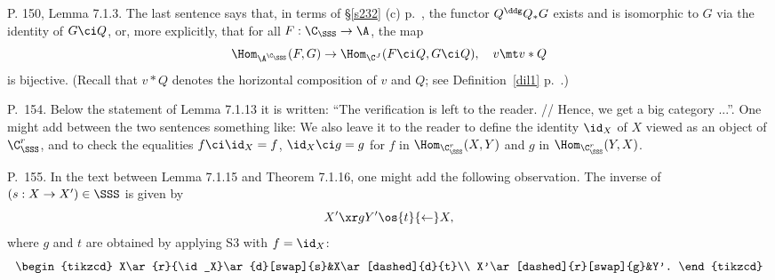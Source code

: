 \documentclass[12pt]{article}
\theoremstyle{remark}
\theoremstyle{definition}
\begin{document}
%


%

\begin{s} 
P. 150, Lemma 7.1.3. The last sentence says that, in terms of \S\ref{s232} (c) p.~, the functor $Q^\ddg Q_*G$ exists and is isomorphic to $G$ via the identity of $G\ci Q$, or, more explicitly, that for all $F:\C_\SSS\to\A$, the map 
$$
\Hom_{\A^{\C_\SSS}}(F,G)\to\Hom_{\C^J}(F\ci Q,G\ci Q),\quad v\mt v*Q
$$ 
is bijective. (Recall that $v*Q$ denotes the horizontal composition of $v$ and $Q$; see Definition~\ref{dil1} p.~.)
\end{s}

%

\begin{s} 
P.~154. Below the statement of Lemma 7.1.13 it is written: ``The verification is left to the reader. // Hence, we get a big category ...''. One might add between the two sentences something like: We also leave it to the reader to define the identity $\id_X$ of $X$ viewed as an object of $\C^r_\SSS$, and to check the equalities $f\ci\id_X=f$, $\id_X\ci g=g$ for $f$ in $\Hom_{\C^r_\SSS}(X,Y)$ and $g$ in $\Hom_{\C^r_\SSS}(Y,X)$.
\end{s}

%

\begin{s} 
P.~155. In the text between Lemma 7.1.15 and Theorem 7.1.16, one might add the following observation. The inverse of $(s:X\to X')\in\SSS$ is given by 
$$
X'\xr gY'\os{t}{\leftarrow}X,
$$
where $g$ and $t$ are obtained by applying S3 with $f=\id_X$:
$$
\begin{tikzcd}
X\ar{r}{\id_X}\ar{d}[swap]{s}&X\ar[dashed]{d}{t}\\ X'\ar[dashed]{r}[swap]{g}&Y'.
\end{tikzcd}
$$
\end{s}

%


\end{document}
